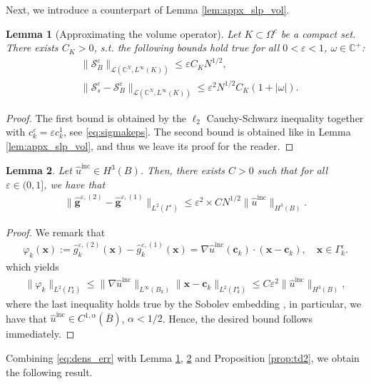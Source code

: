 \documentclass[]{article}
\newtheorem{lemma}{Lemma}
\numberwithin{equation}{section}
\numberwithin{theorem}{section}
\numberwithin{lemma}{section}
\numberwithin{corollary}{section}
\numberwithin{proposition}{section}
\numberwithin{definition}{section}
\newcommand{\bx}{\boldsymbol{x}}
\newcommand{\bc}{\boldsymbol{c}}
\newcommand{\re}{\varepsilon}
\renewcommand{\vec}{\boldsymbol}
\newcommand{\inc}{\operatorname{inc}}
\begin{document}
\begin{appendices}
		Next, we introduce a counterpart of Lemma \ref{lem:appx_slp_vol}.
		\begin{lemma}[Approximating the volume operator]
			\label{lem:appx_slp}
			Let $K\subset \Omega^c$ be a compact set. There exists $C_K>0$, s.t. the following bounds hold true for all $0<\re<1$, $\omega\in \mathbb{C}^+$:
			\begin{align*}%
				&\|\mathcal{S}^{\re}_B\|_{\mathcal{L}(\mathbb{C}^N, L^{\infty}(K))}\leq \re  C_KN^{1/2},\\
				&\|\mathcal{S}^{\re}_s-\mathcal{S}^{\re}_B\|_{\mathcal{L}(\mathbb{C}^N, L^{\infty}(K))}\leq \varepsilon^2N^{1/2}C_K(1+|\omega|).
			\end{align*}
		\end{lemma}
		\begin{proof}
			The first bound is obtained by the $\ell_2$ Cauchy-Schwarz inequality together with  $c^{\re}_k=\re c_k^1$, see \eqref{eq:sigmakeps}. The second bound is obtained like in Lemma \ref{lem:appx_slp_vol}, and thus we leave its proof for the reader.  
		\end{proof}
		\begin{lemma}
			\label{lem:bound_rhs_born}
			Let $\hat{u}^{\inc}\in H^3(B)$. Then, there exists $C>0$ such that for all $\re \in(0,1]$, we have that
			\begin{align*}
				\|	\hat{\vec{g}}^{\re,(2)}-	\hat{\vec{g}}^{\re,(1)}\|_{L^2(\Gamma^{\re})} \leq \re^{2} \times CN^{1/2}\| \hat{u}^{\inc} \|_{H^3(B)}.
			\end{align*}
		\end{lemma}
		\begin{proof}
			We remark that 
			\begin{align*}
				\varphi_{k}(\bx) := \hat{g}^{\re,(2)}_k(\bx) - \hat{g}^{\re,(1)}_k(\bx) = \nabla \hat{u}^{\inc}(\bc_k) \cdot (\bx-\bc_k), \quad \bx \in \Gamma^{\re}_k.
			\end{align*}
			which yields 
			\begin{align*}
				\| \varphi_{k} \|_{L^2(\Gamma^{\re}_k)} \leq \| \nabla \hat{u}^{\inc}\|_{L^{\infty}(B_k)} \| \bx-\bc_k \|_{L^2(\Gamma^{\re}_k)} \leq C\re^2\| \hat{u}^{\inc} \|_{H^{3}(B)},
			\end{align*}
			where the last inequality holds true by the Sobolev embedding \cite[Theorem 4.12, part 2]{adams}, in particular, we have that $\hat{u}^{\inc}\in C^{1,\alpha}(\overline{B})$, $\alpha<1/2$. Hence, the desired bound follows immediately. 
		\end{proof}
		Combining \eqref{eq:dens_err} with Lemma \ref{lem:appx_slp}, \ref{lem:bound_rhs_born} and Proposition \ref{prop:td2}, we obtain the following result.

\end{appendices}
\end{document}
